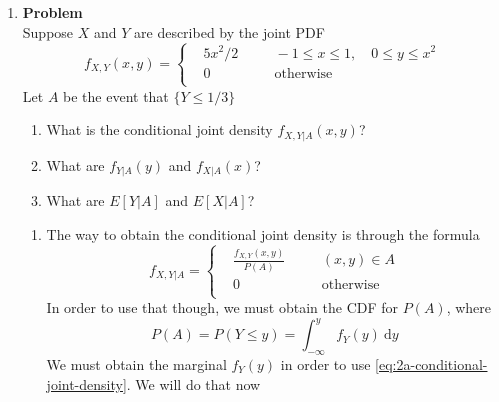 \documentclass[12pt]{article}
\newenvironment{Ex}{\textbf{Problem}\vspace{.75em}\\}{}
\newcommand{\dd}[1]{\:\mathrm{d}{#1}}
\begin{document}
\begin{enumerate}
\begin{Ex}
\begin{solution}
\begin{enumerate}
\begin{equation}
\begin{aligned}
            \dd{x} \\
            &= \int_{3}^{4} \frac{1}{x} \frac{x}{\frac{7}{2}} \dd{x} \\
            &= \int_{3}^{4} \frac{1}{x} \frac{2x}{7} \dd{x} \\
            &= \int_{3}^{4} \frac{2}{7} \dd{x} \\
            \implies E\left[\frac{1}{X}|Y=3\right] &= \frac{2}{7} \\
          \end{aligned}
        \end{equation}
      \end{enumerate}
    \end{solution}
  \end{Ex}
\item
  \begin{Ex}
    Suppose $X$ and $Y$ are described by the joint PDF
    \begin{equation}
      \label{eq:2-question}
      f_{X,Y}(x,y) = \left\{
        \begin{aligned}
          &5x^2/2 &&\quad -1 \le x \le 1, \quad 0\le y \le x^2 \\
          &0 &&\quad \text{otherwise} \\
        \end{aligned} \right.
    \end{equation}
    Let $A$ be the event that $\{Y\le 1/3\}$
    \begin{enumerate}
    \item What is the conditional joint density $f_{X,Y|A}(x,y)$?
    \item What are $f_{Y|A}(y)$ and $f_{X|A}(x)$?
    \item What are $E[Y|A]$ and $E[X|A]$?
    \end{enumerate}
    \begin{solution} \hfill
      \begin{enumerate}
      \item The way to obtain the conditional joint density is through
        the formula
        \begin{equation}
          \label{eq:2a-conditional-joint-density}
          f_{X,Y|A} = \left\{
            \begin{aligned}
              & \frac{f_{X,Y}(x,y)}{P(A)} &&\quad(x,y) \in A \\
              & 0 &&\quad\text{otherwise} \\
            \end{aligned} \right.
        \end{equation}
        In order to use that though, we must obtain the CDF for
        $P(A)$, where
        \begin{equation}
          \label{eq:2a-cdf-def}
          P(A) = P(Y \le y) = \int_{-\infty}^{y} f_{Y}(y) \dd{y}
        \end{equation}
        We must obtain the marginal $f_Y(y)$ in order to use
        \cref{eq:2a-conditional-joint-density}. We will do that now


\end{enumerate}
\end{solution}
\end{Ex}
\end{enumerate}
\end{document}
